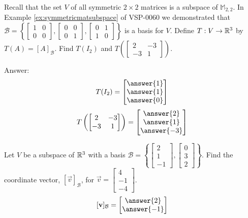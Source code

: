 \documentclass{ximera}
\begin{document}
\begin{problem}\label{prob:symmMatLinTrans}
Recall that the set $V$ of all symmetric $2\times 2$ matrices is a subspace of $\mathbb{M}_{2,2}$.  In Example \ref{ex:symmetricmatsubspace} of VSP-0060 we demonstrated that $\mathcal{B} = \left\{
\begin{bmatrix}
1 & 0 \\
0 & 0
\end{bmatrix}, \begin{bmatrix}
0 & 0 \\
0 & 1
\end{bmatrix}, \begin{bmatrix}
0 & 1 \\
1 & 0
\end{bmatrix}
\right\}$ is a basis for $V$.  Define $T:V\rightarrow \mathbb{R}^3$ by $T(A)=[A]_{\mathcal{B}}$.  Find $T(I_2)$ and $T\left(\begin{bmatrix}2&-3\\-3&1\end{bmatrix}\right)$.

Answer:
$$T(I_2)=\begin{bmatrix}\answer{1}\\\answer{1}\\\answer{0}\end{bmatrix}$$
$$T\left(\begin{bmatrix}2&-3\\-3&1\end{bmatrix}\right)=\begin{bmatrix}\answer{2}\\\answer{1}\\\answer{-3}\end{bmatrix}$$
\end{problem}

\begin{problem}\label{prob:coordvector}
Let $V$ be a subspace of $\mathbb{R}^3$ with a basis $\mathcal{B}=\left\{\begin{bmatrix}2\\1\\-1\end{bmatrix}, \begin{bmatrix}0\\3\\2\end{bmatrix}\right\}$.  Find the coordinate vector, $[\vec{v}]_{\mathcal{B}}$, for $\vec{v}=\begin{bmatrix}4\\-1\\-4\end{bmatrix}$.
$$[\vec{v}]_{\mathcal{B}}=\begin{bmatrix}\answer{2}\\\answer{-1}\end{bmatrix}$$
\end{problem}
\end{document}
